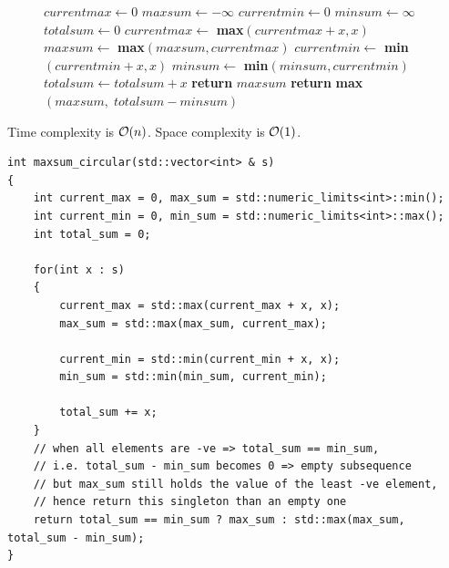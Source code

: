 \begin{s}
\begin{figure}
\begin{center}
\end{center}
\begin{algorithmic}[1]
    \State $currentmax \gets 0$
    \State $maxsum \gets -\infty$
    \State $currentmin \gets 0$
    \State $minsum \gets \infty$
    \State $totalsum \gets 0$
    \Statex
        \State $currentmax \gets$ \textbf{max}$(currentmax + x, x)$
        \State $maxsum \gets$ \textbf{max}$(maxsum, currentmax)$ 
        \Statex
        \State $currentmin \gets$ \textbf{min}$(currentmin + x, x)$
        \State $minsum \gets$ \textbf{min}$(minsum, currentmin)$ 
        \Statex
        \State $totalsum \gets totalsum + x$
    \EndFor
    \Statex
     
        \State \textbf{return} $maxsum$ 
    \Else
        \State \textbf{return} \textbf{max}$(maxsum, \; totalsum - minsum)$
    \EndIf
\EndFunction
\end{algorithmic}
\end{figure}

Time complexity is $\mathcal{O}(n)$. Space complexity is $\mathcal{O}(1)$.

\begin{lstlisting}
int maxsum_circular(std::vector<int> & s)
{
    int current_max = 0, max_sum = std::numeric_limits<int>::min();
    int current_min = 0, min_sum = std::numeric_limits<int>::max();
    int total_sum = 0;

    for(int x : s)
    {
        current_max = std::max(current_max + x, x);
        max_sum = std::max(max_sum, current_max);

        current_min = std::min(current_min + x, x);
        min_sum = std::min(min_sum, current_min);

        total_sum += x;
    }
    // when all elements are -ve => total_sum == min_sum, 
    // i.e. total_sum - min_sum becomes 0 => empty subsequence
    // but max_sum still holds the value of the least -ve element,
    // hence return this singleton than an empty one
    return total_sum == min_sum ? max_sum : std::max(max_sum, total_sum - min_sum);
}
\end{lstlisting}


\end{s}
